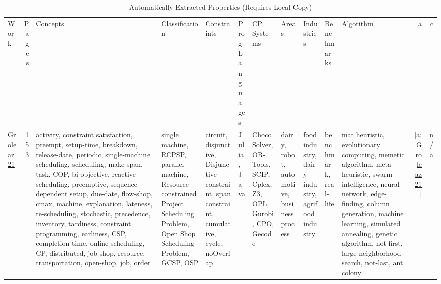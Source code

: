 {\scriptsize
\begin{longtable}{>{\raggedright\arraybackslash}p{3cm}r>{\raggedright\arraybackslash}p{4cm}p{1.5cm}p{2cm}p{1.5cm}p{1.5cm}p{1.5cm}p{1.5cm}p{2cm}p{1.5cm}rr}
\rowcolor{white}\caption{Automatically Extracted  Properties (Requires Local Copy)}\\ \toprule
\rowcolor{white}Work & Pages & Concepts & Classification & Constraints & \shortstack{Prog\\Languages} & \shortstack{CP\\Systems} & Areas & Industries & Benchmarks & Algorithm & a & c\\ \midrule\endhead
\bottomrule
\endfoot
\href{../works/Groleaz21.pdf}{Groleaz21}~\cite{Groleaz21} & 153 & activity, constraint satisfaction, preempt, setup-time, breakdown, release-date, periodic, single-machine scheduling, scheduling, make-span, task, COP, bi-objective, reactive scheduling, preemptive, sequence dependent setup, due-date, flow-shop, cmax, machine, explanation, lateness, re-scheduling, stochastic, precedence, inventory, tardiness, constraint programming, earliness, CSP, completion-time, online scheduling, CP, distributed, job-shop, resource, transportation, open-shop, job, order & single machine, RCPSP, parallel machine, Resource-constrained Project Scheduling Problem, Open Shop Scheduling Problem, GCSP, OSP & circuit, disjunctive, Disjunctive constraint, span constraint, cumulative, cycle, noOverlap & Julia, Java & Choco Solver, OR-Tools, SCIP, Cplex, Z3, OPL, Gurobi, CPO, Gecode & dairy, robot, automotive, business process & food industry, dairy industry, agrifood industry & benchmark, real-life & mat heuristic, evolutionary computing, memetic algorithm, meta heuristic, swarm intelligence, neural network, edge-finding, column generation, machine learning, simulated annealing, genetic algorithm, not-first, large neighborhood search, not-last, ant colony & \ref{a:Groleaz21} & n/a\\

\end{longtable}}
